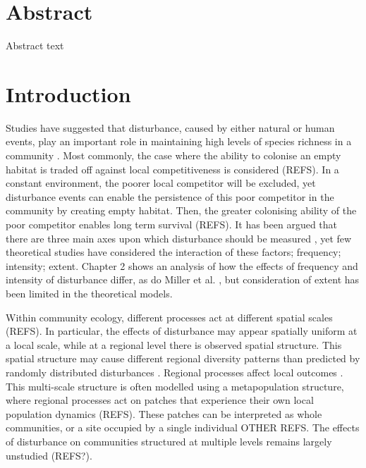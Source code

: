 \newpage
{}
\vspace*{\fill}
\section*{Abstract}
Abstract text
\vspace*{\fill}
\newpage
\section{Introduction}
Studies have suggested that disturbance, caused by either natural or human events, play an important role in maintaining high levels of species richness in a community \cite{connell1978diversity,huston1979general,sousa1984role,schoener1974resource}. Most commonly, the case where the ability to colonise an empty habitat is traded off against local competitiveness is considered (REFS). In a constant environment, the poorer local competitor will be excluded, yet disturbance events can enable the persistence of this poor competitor in the community by creating empty habitat. Then, the greater colonising ability of the poor competitor enables long term survival (REFS). It has been argued that there are three main axes upon which disturbance should be measured \cite{malanson1984intensity,miller1982community,sousa1984role}, yet few theoretical studies have considered the interaction of these factors; frequency; intensity; extent. Chapter 2 shows an analysis of how the effects of frequency and intensity of disturbance differ, as do Miller et al. \cite{miller2011frequency}, but consideration of extent has been limited in the theoretical models.

Within community ecology, different processes act at different spatial scales (REFS). In particular, the effects of disturbance may appear spatially uniform at a local scale, while at a regional level there is observed spatial structure. This spatial structure may cause different regional diversity patterns than predicted by randomly distributed disturbances \cite{vuilleumier2007patch}. Regional processes affect local outcomes \cite{holt1993ecology}. This multi-scale structure is often modelled using a metapopulation structure, where regional processes act on patches that experience their own local population dynamics (REFS). These patches can be interpreted as whole communities, or a site occupied by a single individual \cite{tilman1994competition,calcagno2006coexistence} OTHER REFS.  The effects of disturbance on communities structured at multiple levels remains largely unstudied (REFS?).


